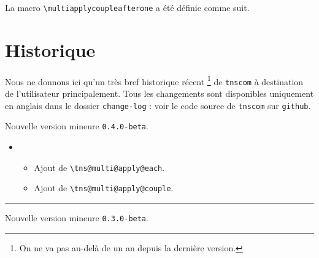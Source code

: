 \documentclass[12pt,a4paper]{article}
\makeatletter
\newcommand\env[1]{\texttt{#1}}
\newcommand\macro[1]{\env{\textbackslash{}#1}}
\theoremstyle{definition}
\newcommand\separation{
	\medskip
	\hfill\rule{0.5\textwidth}{0.75pt}\hfill
	\medskip
}
\newcommand\topic{\@ifstar{\@topic@star}{\@topic@no@star}}
\newcommand\@topic@no@star[1]{%
	\textbf{\textsc{#1}.}%
}
\newcommand\@topic@star[1]{%
	\textbf{\textsc{#1} :}%
}
\makeatother
\begin{document}
{{{{{{{{{{{\begin{latexex}
\end{latexex}

La macro \macro{multiapplycoupleafterone} a été définie comme suit.

\begin{latexex-alone}
\newcommand\decocoupleafterfirst[3]{%
    \ifnum#1=1
        \fbox{#2-#3}%
    \else%
        (#2-#3)%
    \fi
}

\newcommand\multiapplycoupleafterone[1]{%
    \tns@multi@apply@couple{\decocoupleafterfirst}{#1}
}
\end{latexex-alone}


\newpage

\section{Historique}

Nous ne donnons ici qu'un très bref historique récent
\footnote{
	On ne va pas au-delà de un an depuis la dernière version.
}
de \verb+tnscom+ à destination de l'utilisateur principalement.
Tous les changements sont disponibles uniquement en anglais dans le dossier \verb+change-log+ : voir le code source de \verb+tnscom+ sur \verb+github+.

\begin{description}

    \medskip
    \item[2020-08-05] Nouvelle version mineure \verb+0.4.0-beta+.
    
    \begin{itemize}[itemsep=.5em]
        \item \topic{Multi-argument}
        \begin{itemize}[itemsep=.5em]
            \item Ajout de \macro{tns@multi@apply@each}.
    
            \item Ajout de \macro{tns@multi@apply@couple}.
        \end{itemize}
    \end{itemize}
    
    \separation


    \medskip
    \item[2020-07-30] Nouvelle version mineure \verb+0.3.0-beta+.
    

\end{description}}}}}}}}}}}}
\end{document}
